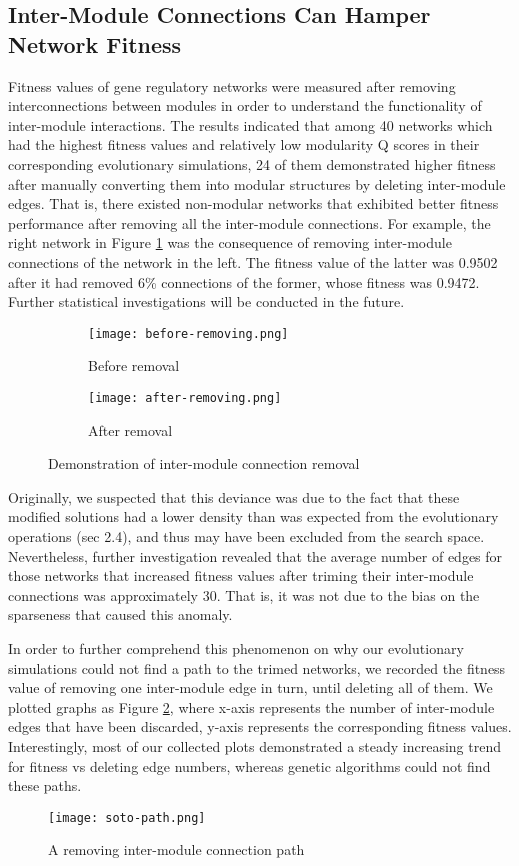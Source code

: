 \subsection{Inter-Module Connections Can Hamper Network Fitness}
Fitness values of gene regulatory networks were measured after removing interconnections between modules in order to understand the functionality of inter-module interactions. The results indicated that among 40 networks which had the highest fitness values and relatively low modularity Q scores in their corresponding evolutionary simulations, 24 of them demonstrated higher fitness after manually converting them into modular structures by deleting inter-module edges. That is, there existed non-modular networks that exhibited better fitness performance after removing all the inter-module connections. For example, the right network in Figure \ref{fig:connection-removal} was the consequence of removing inter-module connections of the network in the left. The fitness value of the latter was 0.9502 after it had removed 6\% connections of the former, whose fitness was 0.9472. Further statistical investigations will be conducted in the future.
\begin{figure}[h!]
	\centering
	\begin{subfigure}[b]{0.45\linewidth}
		\texttt{[image: before-removing.png]}
		\caption{Before removal}
	\end{subfigure}
	\begin{subfigure}[b]{0.45\linewidth}
		\texttt{[image: after-removing.png]}
		\caption{After removal}
	\end{subfigure}
	\caption{Demonstration of inter-module connection removal}
	\label{fig:connection-removal}
\end{figure}
Originally, we suspected that this deviance was due to the fact that these modified solutions had a lower density than was expected from the evolutionary operations (sec 2.4), and thus may have been excluded from the search space. Nevertheless, further investigation revealed that the average number of edges for those networks that increased fitness values after triming their inter-module connections was approximately 30. That is, it was not due to the bias on the sparseness that caused this anomaly. 

In order to further comprehend this phenomenon on why our evolutionary simulations could not find a path to the trimed networks, we recorded the fitness value of removing one inter-module edge in turn, until deleting all of them. We plotted graphs as Figure \ref{fig:soto-path}, where x-axis represents the number of inter-module edges that have been discarded, y-axis represents the corresponding fitness values. Interestingly, most of our collected plots demonstrated a steady increasing trend for fitness vs deleting edge numbers, whereas genetic algorithms could not find these paths. 
\begin{figure}[h!]
	\centering
	\texttt{[image: soto-path.png]}
	\caption{A removing inter-module connection path}
	\label{fig:soto-path}
\end{figure}

